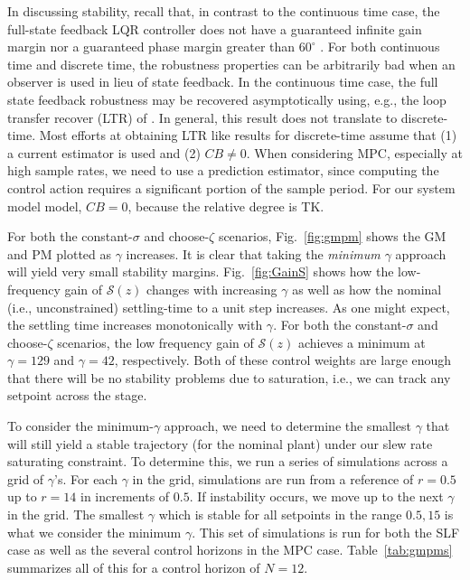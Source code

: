 \documentclass[journal,twocolumn,twoside]{IEEEtran}
\begin{document}
In discussing stability, recall that, in contrast to the continuous time case, the full-state feedback LQR controller does not have a guaranteed infinite gain margin nor a guaranteed phase margin greater than $60^{\circ}$ \cite{andersson_moore}. For both continuous time and discrete time, the robustness properties can be arbitrarily bad when an observer is used in lieu of state feedback. In the continuous time case, the full state feedback robustness may be recovered asymptotically using, e.g., the loop transfer recover (LTR) of \cite{doyle_guaranteed_1978}. In general, this result does not translate to discrete-time. Most efforts at obtaining LTR like results for discrete-time assume that (1) a current estimator is used and (2) $CB\neq 0$. When considering MPC, especially at high sample rates, we need to use a prediction estimator, since computing the control action requires a significant portion of the sample period. For our system model model, $CB=0$, because the relative degree is TK. 


For both the constant-$\sigma$ and choose-$\zeta$ scenarios, Fig.~\ref{fig:gmpm} shows the GM and PM plotted as $\gamma$ increases. It is clear that taking the \emph{minimum $\gamma$} approach will yield very small stability margins. Fig.~\ref{fig:GainS} shows how the low-frequency gain of $\mathcal{S}(z)$ changes with increasing $\gamma$ as well as how the nominal (i.e., unconstrained) settling-time to a unit step increases. As one might expect, the settling time increases monotonically with $\gamma$. For both the constant-$\sigma$ and choose-$\zeta$ scenarios, the low frequency gain of $\mathcal{S}(z)$ achieves a minimum at ${\gamma=129}$ and $\gamma=42$, respectively. Both of these control weights are large enough that there will be no stability problems due to saturation, i.e., we can track any setpoint across the stage.

To consider the minimum-$\gamma$ approach, we need to determine the smallest $\gamma$ that will still yield a stable trajectory (for the nominal plant) under our slew rate saturating constraint. To determine this, we run a series of simulations across a grid of $\gamma$'s. For each $\gamma$ in the grid, simulations are run from a reference of $r=0.5$ up to $r=14$ in increments of $0.5$. If instability occurs, we move up to the next $\gamma$ in the grid. The smallest $\gamma$ which is stable for all setpoints in the range $0.5, 15$ is what we consider the minimum $\gamma$. This set of simulations is run for both the SLF case as well as the several control horizons in the MPC case. Table~\ref{tab:gmpms} summarizes all of this for a control horizon of $N=12$.
\end{document}
